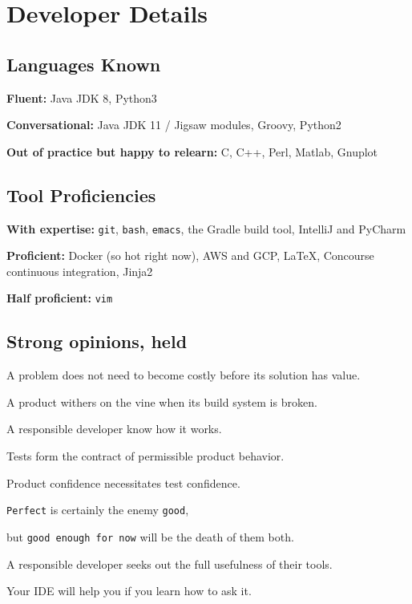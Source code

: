 \documentclass[10pt,letterpaper]{article}
\newcommand\ttt\texttt
\renewenvironment{itemize}{
  \begin{list}{}{
    \setlength{\leftmargin}{1.5em}
    \setlength{\itemsep}{0.25em}
    \setlength{\parskip}{0pt}
    \setlength{\parsep}{0.25em}
  }
}{
  \end{list}
}
\begin{document}

\newpage

\section*{Developer Details}
\subsection*{Languages Known}
\begin{itemize}
  \item \textbf{Fluent:}
    Java JDK 8,
    Python3
  \item \textbf{Conversational:}
    Java JDK 11 / Jigsaw modules,
    Groovy,
    Python2
  \item \textbf{Out of practice but happy to relearn:}
    C,
    C++,
    Perl,
    Matlab,
    Gnuplot
\end{itemize}

\subsection*{Tool Proficiencies}
\begin{itemize}
  \item \textbf{With expertise:}
    \ttt{git},
    \ttt{bash},
    \ttt{emacs},
    the Gradle build tool,
    IntelliJ and PyCharm
  \item \textbf{Proficient:} Docker (so hot right now),
    AWS and GCP,
    \LaTeX,
    Concourse continuous integration,
    Jinja2
  \item \textbf{Half proficient:}
    \ttt{vim}
\end{itemize}

\newcommand{\opinionsPar}{\par\vspace{-.3em}\quad}
\newcommand{\gah}[1]{\ttt{#1}}
\subsection*{Strong opinions, held}
\begin{itemize}
  \item A problem does not need to become costly before its solution has value.
  \item A product withers on the vine when its build system is broken.\opinionsPar
    A responsible developer know how it works.
  \item Tests form the contract of permissible product behavior.\opinionsPar
    Product confidence necessitates test confidence.
  \item \gah{Perfect} is certainly the enemy \gah{good},\opinionsPar
    but \gah{good enough for now} will be the death of them both.
  \item A responsible developer seeks out the full usefulness of their tools.\opinionsPar
    Your IDE will help you if you learn how to ask it.
\end{itemize}
\end{document}
